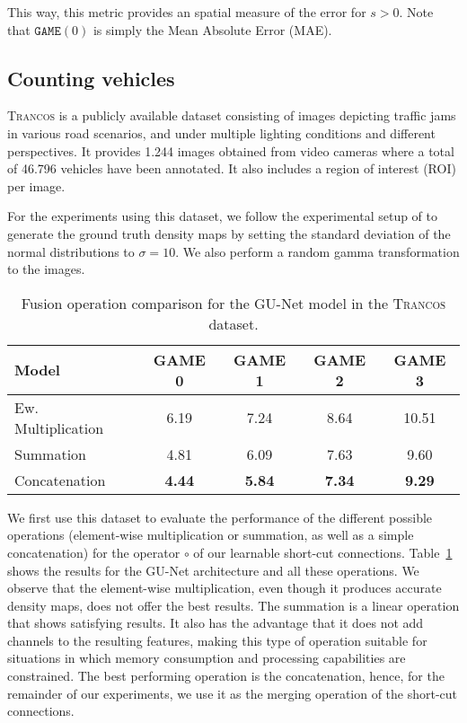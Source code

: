 \documentclass{bmvc2k}
\begin{document}
This way, this metric provides an spatial measure of the error for $s > 0$. Note that $\mathtt{GAME}(0)$ is simply the Mean Absolute Error (MAE).

\subsection{Counting vehicles}\textsc{Trancos} is a publicly available dataset consisting of images depicting traffic jams in various road scenarios, and under multiple lighting conditions and different perspectives. It provides 1.244 images obtained from video cameras where a total of 46.796 vehicles have been annotated. It also includes a region of interest (ROI) per image.

For the experiments using this dataset, we follow the experimental setup of \cite{guerrero2015} to generate the ground truth density maps by setting the standard deviation of the normal distributions to $\sigma=10$. We also perform a random gamma transformation to the images.

\begin{table}[t!]
\small
\centering
\caption{Fusion operation comparison for the GU-Net model in the \textsc{Trancos} dataset.}
\label{tab:trancos_fusion}
\begin{tabular}{|l|c|c|c|c|}
\hline
Model                           & GAME 0 & GAME 1 & GAME 2 & GAME 3 \\
\hline
\hline
Ew. Multiplication              & 6.19   & 7.24   & 8.64   & 10.51   \\
\hline
Summation                       & 4.81   & 6.09   & 7.63   & 9.60   \\
\hline
Concatenation                   & \textbf{4.44}   & \textbf{5.84}   & \textbf{7.34}   & \textbf{9.29}   \\
\hline
\end{tabular}
\end{table}

We first use this dataset to evaluate the performance of the different possible operations (element-wise multiplication or summation, as well as a simple concatenation) for the operator $\circ$ of our learnable short-cut connections. Table~\ref{tab:trancos_fusion} shows the results for the GU-Net architecture and all these operations. We observe that the element-wise multiplication, even though it produces accurate density maps, does not offer the best results. The summation is a linear operation that shows satisfying results. It also has the advantage that it does not add channels to the resulting features, making this type of operation suitable for situations in which memory consumption and processing capabilities are constrained. The best performing operation is the concatenation, hence, for the remainder of our experiments, we use it as the merging operation of the short-cut connections.
\end{document}
